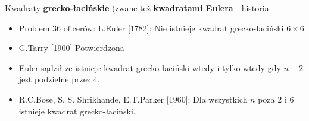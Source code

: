 \documentclass{beamer}
\begin{document}
\begin{frame}
  \begin{block}{Kwadraty {\bf grecko-łacińskie} (zwane też {\bf kwadratami Eulera}
      - historia}
  \end{block}

  \begin{itemize}
  \item<1->
    {\color{blue} Problem 36 oficerów}:
    L.Euler [1782]: Nie istnieje kwadrat grecko-łaciński $6\times 6$
  \item<2->G.Tarry [1900] Potwierdzona
  \item<3-> Euler sądził że istnieje kwadrat grecko-łaciński wtedy
    i tylko wtedy gdy $n - 2$ jest podzielne przez $4$.
  \item<4-> R.C.Bose, S. S. Shrikhande, E.T.Parker [1960]:
    Dla wszystkich $n$ poza $2$ i $6$ istnieje kwadrat
    grecko-łaciński.
    \end{itemize}
\end{frame}
\end{document}
